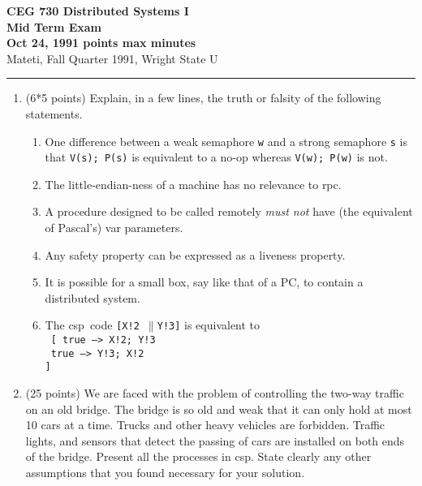 \def\fat{\framebox[1mm]{\rule{0mm}{2mm}}}
\def\pr{$\parallel$}
\def\CSP{{\sc csp}}
\def\RPC{{\sc rpc}}
\parindent=0pt



{\bf CEG 
\large \bf 730 Distributed Systems I\\[5pt]
\large Mid Term Exam\\[10pt]
Oct 24, 1991  points max  minutes\\
}
\bigskip
{Mateti,  Fall Quarter 1991, Wright State U}\\[-5pt]
\hrule

\begin{enumerate}

\item (6*5 points)
Explain, in a few lines, the truth or falsity of the following
statements.

\begin{enumerate}

\item One difference between a weak semaphore {\tt w} and a strong
semaphore {\tt s} is that {\tt V(s); P(s)} is equivalent to a no-op
whereas {\tt V(w); P(w)} is not.

\item
The little-endian-ness of a machine has no relevance to \RPC.

\item
A procedure designed to be called remotely {\em must not} have
(the equivalent of Pascal's) var parameters.

\item
Any safety property can be expressed as a liveness property.

\item It is possible for a small box, say like that of a PC, to
contain a distributed system.

\item
The \CSP\ code {\tt [X!2 \pr Y!3]} is equivalent to \\
{\tt
[  true --> X!2; Y!3\\
\fat\ true --> Y!3; X!2\\
]
}

\end{enumerate}

\item (25 points) We are faced with the problem of controlling the
two-way traffic on an old bridge.  The bridge is so old and weak that
it can only hold at most 10 cars at a time.  Trucks and other heavy
vehicles are forbidden.  Traffic lights, and sensors that detect the
passing of cars are installed on both ends of the bridge.  Present all
the processes in \CSP.  State clearly any other assumptions that you
found necessary for your solution.


\end{enumerate}
